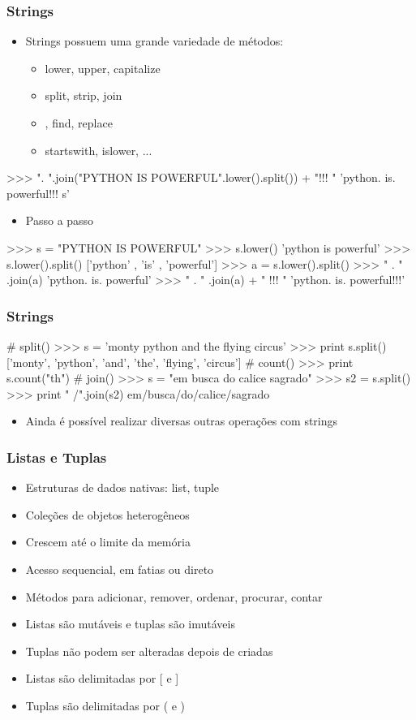 \documentclass[12pt,t,graphics]{beamer}
\newcommand{\ft}[1]{\frametitle{#1}}
\newcommand{\bi}{\begin{itemize}}
\newcommand{\ei}{\end{itemize}}
\begin{document}

\begin{frame}[fragile]
  \ft{Strings}
  \bi
\item Strings possuem uma grande variedade de métodos:
  \bi
\item lower, upper, capitalize
\item split, strip, join
\item, find, replace
\item startswith, islower, ...
  \ei
  \ei	
  \begin{python}
    >>> ". ".join("PYTHON IS POWERFUL".lower().split()) + "!!! "
    'python. is. powerful!!! s'		
  \end{python}	
  \bi
\item Passo a passo
  \ei
  \begin{python}
    >>> s = "PYTHON IS POWERFUL"
    >>> s.lower()
    'python is powerful'
    >>> s.lower().split()
    ['python' , 'is' , 'powerful']
    >>> a = s.lower().split()
    >>> " . " .join(a)
    'python. is. powerful'
    >>> " . " .join(a) + " !!! "
    'python. is. powerful!!!' 		
  \end{python}
\end{frame}


\begin{frame}[fragile]
  \ft{Strings}
  \begin{python}
    # split()
    >>> s = 'monty python and the flying circus'
    >>> print s.split()
    ['monty', 'python', 'and', 'the', 'flying', 'circus'] 
    # count()
    >>> print s.count("th")
    # join()
    >>> s = "em busca do calice sagrado"
    >>> s2 = s.split()
    >>> print " /".join(s2)
    em/busca/do/calice/sagrado		
  \end{python}
  \bi
\item Ainda é possível realizar diversas outras
  operações com strings
  \ei
\end{frame}


\begin{frame}[fragile]
  \ft{Listas e Tuplas}
  \bi
\item Estruturas de dados nativas: list, tuple
\item Coleções de objetos heterogêneos
\item Crescem até o limite da memória
\item Acesso sequencial, em fatias ou direto
\item Métodos para adicionar, remover, ordenar,
  procurar, contar
\item Listas são mutáveis e tuplas são imutáveis
\item Tuplas não podem ser alteradas depois de criadas
\item Listas são delimitadas por [ e ]
\item Tuplas são delimitadas por ( e )
  \ei
\end{frame}
\end{document}
